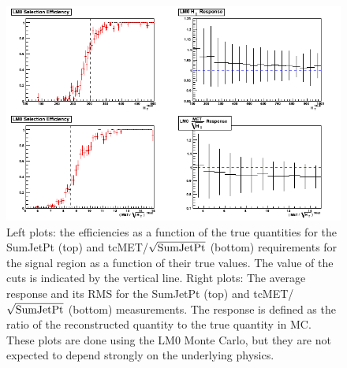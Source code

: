 \begin{figure}[tbh]
\begin{center}
\includegraphics[width=\linewidth]{selectionEffDec10.png}
\caption{\label{fig:response} Left plots: the efficiencies
as a function of the true quantities for the SumJetPt (top) and
tcMET/$\sqrt{\rm SumJetPt}$ (bottom) requirements for the signal 
region as a function of their true values.  The value of the 
cuts is indicated by the vertical line.
Right plots: The average response and its RMS for the SumJetPt
(top) and tcMET/$\sqrt{\rm SumJetPt}$ (bottom) measurements.
The response is defined as the ratio of the reconstructed quantity
to the true quantity in MC.  These plots are done using the LM0
Monte Carlo, but they are not expected to depend strongly on 
the underlying physics.
}
\end{center}
\end{figure}



%



%



